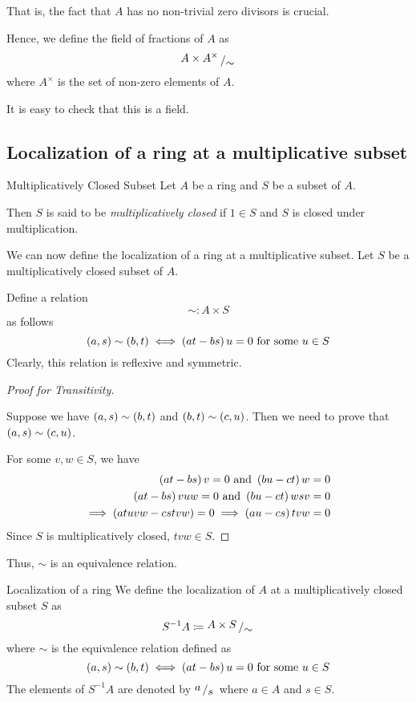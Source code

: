 That is, the fact that \(A\) has no non-trivial zero divisors is crucial.

Hence, we define the field of fractions of \(A\) as
\[
	\bigslant{A \times A^{\times}}{\sim}
\]
where \(A^{\times}\) is the set of non-zero elements of \(A\).

It is easy to check that this is a field.

\subsection{Localization of a ring at a multiplicative subset}

\begin{defn}{Multiplicatively Closed Subset}{}
	Let \(A\) be a ring and \(S\) be a subset of \(A\).

	Then \(S\) is said to be \emph{multiplicatively closed} if
	\(1 \in S\) and \(S\) is closed under multiplication.
\end{defn}

We can now define the localization of a ring at a multiplicative subset.
Let \(S\) be a multiplicatively closed subset of \(A\).

Define a relation
\[
	\sim \colon A \times S
\]
as follows
\[
	\left( a, s \right) \sim \left( b, t \right) \iff \left( at - bs \right)u = 0
	\text{ for some } u \in S
\]
Clearly, this relation is reflexive and symmetric.

\begin{proof}[Proof for Transitivity] \

	Suppose we have \(\left( a, s \right) \sim \left( b, t \right)\) and
	\(\left( b, t \right) \sim \left( c, u \right)\).
	Then we need to prove that \(\left( a, s \right) \sim \left( c, u \right)\).

	For some \(v, w \in S\), we have
	\begin{align*}
		\left( at - bs \right)v = 0 \text{ and } \left( bu - ct \right)w = 0 \\
		\left( at - bs \right)vuw = 0 \text{ and } \left( bu - ct \right)wsv = 0 \\
		\implies \left( atuvw - cstvw \right) = 0
		\implies \left( au - cs \right)tvw = 0
	\end{align*}
	Since \(S\) is multiplicatively closed, \(tvw \in S\).
\end{proof}
Thus, \(\sim\) is an equivalence relation.

\begin{defn}{Localization of a ring}{}
	We define the localization of \(A\) at a multiplicatively closed
	subset \(S\) as
	\[
		S^{-1}A \coloneqq \bigslant{A \times S}{\sim}
	\]
	where \(\sim\) is the equivalence relation defined as
	\[
		\left( a, s \right) \sim \left( b, t \right) \iff \left( at - bs \right)u = 0
		\text{ for some } u \in S
	\]
	The elements of \(S^{-1}A\) are denoted by \(\bigslant{a}{s}\)
	where \(a \in A\) and \(s \in S\).
\end{defn}



